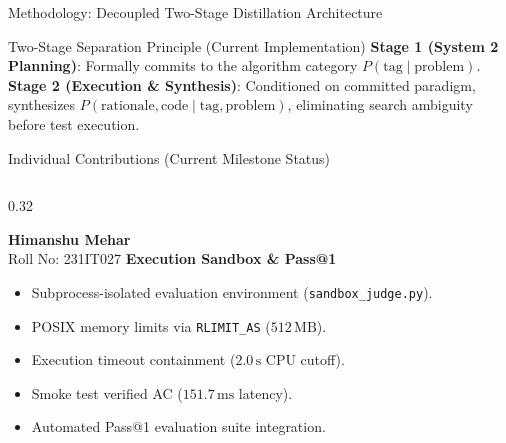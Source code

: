 \documentclass[aspectratio=169,10pt]{beamer}
\begin{document}
\begin{frame}{Methodology: Decoupled Two-Stage Distillation Architecture}
  \begin{block}{Two-Stage Separation Principle (Current Implementation)}
    \textbf{Stage 1 (System 2 Planning)}: Formally commits to the algorithm category $P(\text{tag} \mid \text{problem})$. \\
    \textbf{Stage 2 (Execution \& Synthesis)}: Conditioned on committed paradigm, synthesizes $P(\text{rationale}, \text{code} \mid \text{tag}, \text{problem})$, eliminating search ambiguity before test execution.
  \end{block}
\end{frame}

\begin{frame}{Individual Contributions (Current Milestone Status)}
  \begin{columns}[T]
    \begin{column}{0.32\textwidth}
      \begin{block}{\textbf{Himanshu Mehar}\\[1pt]\scriptsize Roll No: 231IT027}
        \textbf{Execution Sandbox \& Pass@1}
        \vspace{3pt}
        \begin{itemize}\itemsep=2.5pt\footnotesize
          \item Subprocess-isolated evaluation environment (\texttt{sandbox\_judge.py}).
          \item POSIX memory limits via \texttt{RLIMIT\_AS} ($512\,\text{MB}$).
          \item Execution timeout containment ($2.0\,\text{s}$ CPU cutoff).
          \item Smoke test verified AC ($151.7\,\text{ms}$ latency).
          \item Automated Pass@1 evaluation suite integration.
        \end{itemize}
      \end{block}
    \end{column}


\end{columns}
\end{frame}
\end{document}
